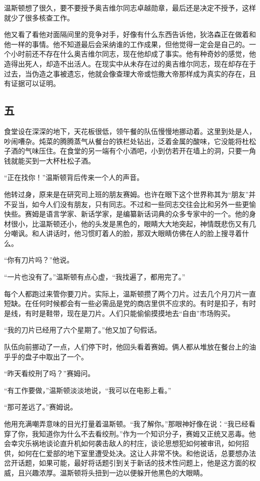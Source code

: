 温斯顿想了很久，要不要授予奥吉维尔同志卓越勋章，最后还是决定不授予，这样就少了很多核查工作。

他又看了看他对面隔间里的竞争对手，好像有什么东西告诉他，狄洛森正在做着和他一样的事情。他不知道最后会采纳谁的工作成果，但他觉得一定会是自己的。一个小时前还不存在什么奥吉维尔同志，现在他却成了事实。他有种奇妙的感觉，他造得出死人，却造不出活人。在现实中从未存在过的奥吉维尔同志，现在却存在于过去，当伪造之事被遗忘，他就会像查理大帝或恺撒大帝那样成为真实的存在，且有证据可以证明。

\subsection{五}\label{ux4e94}

食堂设在深深的地下，天花板很低，领午餐的队伍慢慢地挪动着。这里到处是人，吵闹嘈杂。炖菜的腾腾蒸气从餐台的铁栏处钻出，泛着金属的酸味，它没能将杜松子酒的气味压住。在食堂的另一端有个小酒吧，小到仿若开在墙上的洞，只要一角钱就能买到一大杯杜松子酒。

``正在找你！''温斯顿背后传来一个人的声音。

他转过身，原来是在研究司上班的朋友赛姆。也许在眼下这个世界称其为``朋友''并不妥当，如今人们没有朋友，只有同志。不过和一些同志交往会比和另外一些更愉快些。赛姆是语言学家、新话学家，是编纂新话词典的众多专家中的一个。他的身材很小，比温斯顿还小，他的头发是黑色的，眼睛大大地突起，神情既悲伤又有几分嘲讽。和人讲话时，他习惯盯着人的脸，那双大眼睛仿佛在人的脸上搜寻着什么。

``你有刀片吗？''他说。

``一片也没有了。''温斯顿有点心虚，``我找遍了，都用完了。''

每个人都跑过来管你要刀片。实际上，温斯顿攒了两个刀片。过去几个月刀片一直短缺。在任何时候都会有一些必需品是党的商店里供不应求的。有时是扣子，有时是线，有时是鞋带，现在是刀片。人们只能偷偷摸摸地去``自由''市场购买。

``我的刀片已经用了六个星期了。''他又加了句假话。

队伍向前挪动了一点，人们停下时，他回头看着赛姆。俩人都从堆放在餐台上的油乎乎的盘子中取出了一个。

``昨天看绞刑了吗？''赛姆问。

``有工作要做，''温斯顿淡淡地说，``我可以在电影上看。''

``那可差远了。''赛姆说。

他用充满嘲弄意味的目光打量着温斯顿。``我了解你。''那眼神好像在说：``我已经看穿了你，我知道你为什么不去看绞刑。''作为一个知识分子，赛姆又正统又恶毒。他会幸灾乐祸地谈论直升机如何袭击敌人的村庄，谈论思想犯如何被审讯，如何招供，如何在仁爱部的地下室里遭受处决。这让人非常不快。和他说话，总要想办法岔开话题，如果可能，最好将话题引到关于新话的技术性问题上，他是这方面的权威，且兴趣浓厚。温斯顿将头扭到一边以便躲开他黑色的大眼睛。

